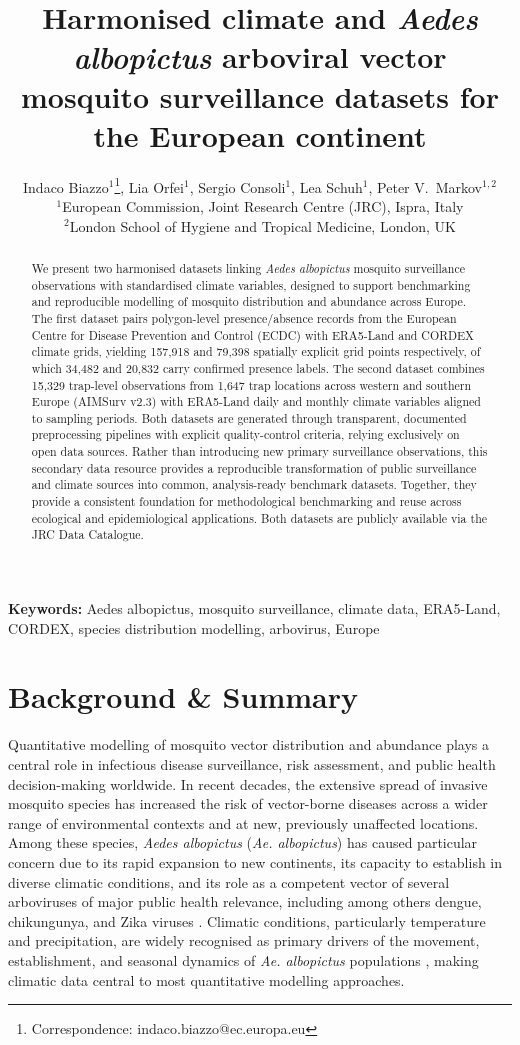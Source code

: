 \documentclass[11pt]{article}
\title{Harmonised climate and \textit{Aedes albopictus} arboviral vector mosquito surveillance datasets for the European continent }
\author{%
Indaco Biazzo$^{1}$\thanks{Correspondence: indaco.biazzo@ec.europa.eu},
Lia Orfei$^{1}$,
Sergio Consoli$^{1}$,
Lea Schuh$^{1}$,
Peter V.\ Markov$^{1,2}$\\[0.5em]
\small $^{1}$European Commission, Joint Research Centre (JRC), Ispra, Italy\\
\small $^{2}$London School of Hygiene and Tropical Medicine, London, UK
}
\date{}
\newcommand{\keywords}[1]{\par\noindent\textbf{Keywords: }#1\par}
\begin{document}
\maketitle

\begin{abstract}

We present two harmonised datasets linking \textit{Aedes 
albopictus} mosquito surveillance observations with standardised climate 
variables, designed to support benchmarking and reproducible modelling of 
mosquito distribution and abundance across Europe. The first dataset pairs 
polygon-level presence/absence records from the European Centre for Disease 
Prevention and Control (ECDC) with ERA5-Land and CORDEX climate grids, 
yielding 157,918 and 79,398 spatially explicit grid points respectively, 
of which 34,482 and 20,832 carry confirmed presence labels. The 
second dataset combines 15,329 trap-level observations from 1,647 trap 
locations across western and southern Europe (AIMSurv v2.3) with ERA5-Land 
daily and monthly climate variables aligned to sampling periods. Both datasets 
are generated through transparent, documented preprocessing pipelines with 
explicit quality-control criteria, relying exclusively on open data sources. 
Rather than introducing new primary surveillance observations, this secondary
data resource provides a reproducible transformation of public surveillance
and climate sources into common, analysis-ready benchmark datasets.
Together, they provide a consistent foundation for methodological benchmarking 
and reuse across ecological and epidemiological applications. Both datasets are 
publicly available via the JRC Data Catalogue.
\end{abstract}

\keywords{Aedes albopictus, mosquito surveillance, climate data, ERA5-Land, CORDEX, species distribution modelling, arbovirus, Europe}

\section*{Background \& Summary}

Quantitative modelling of mosquito vector distribution and abundance plays a central role in infectious disease surveillance, risk assessment, and public health decision-making worldwide. In recent decades, the extensive spread of invasive mosquito species has increased the risk of vector-borne diseases across a wider range of environmental contexts and at new, previously unaffected locations. Among these species, \emph{Aedes albopictus} (\textit{Ae. albopictus}) has caused particular concern due to its rapid expansion to new continents, its capacity to establish in diverse climatic conditions, and its role as a competent vector of several arboviruses of major public health relevance, including among others dengue, chikungunya, and Zika viruses \cite{Wilkerson2020, kraemer2019, kraemer2015}. Climatic conditions, particularly temperature and precipitation, are widely recognised as primary drivers of the movement, establishment, and seasonal dynamics of \emph{Ae. albopictus} populations \cite{ryan2019,Mordecai2019}, making climatic data central to most quantitative modelling approaches.
\end{document}
